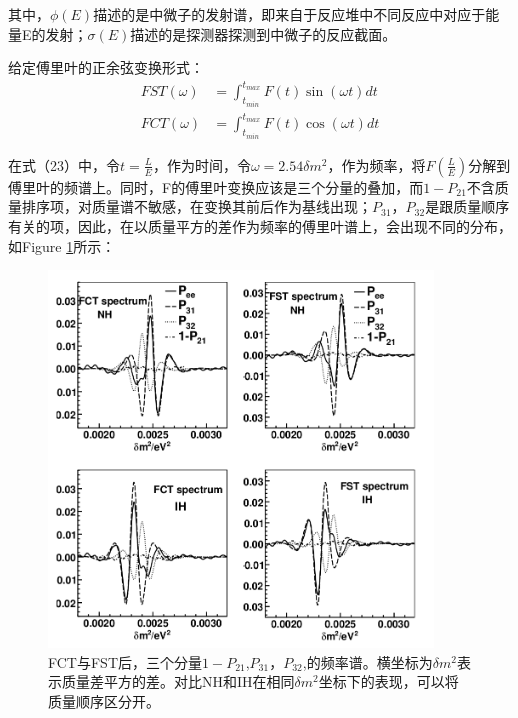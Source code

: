 \documentclass[10pt,a4paper]{article}
\begin{document}
其中，$\phi(E)$描述的是中微子的发射谱，即来自于反应堆中不同反应中对应于能量E的发射；$\sigma(E)$描述的是探测器探测到中微子的反应截面。

给定傅里叶的正余弦变换形式\cite{Zhan:2009rs}\cite{Zhan:2008id}：
\begin{equation}
\label{con:eq27}
\begin{split}
FST(\omega)&=\int_{t_{min}}^{t_{max}}F(t)\sin(\omega t)dt\\
FCT(\omega)&=\int_{t_{min}}^{t_{max}}F(t)\cos(\omega t)dt
\end{split}
\end{equation}


在式（23）中，令$t=\frac{L}{E}$，作为时间，令$\omega=2.54\delta m^2$，作为频率，将$F(\frac{L}{E})$分解到傅里叶的频谱上。同时，F的傅里叶变换应该是三个分量的叠加，而$1-P_{21}$不含质量排序项，对质量谱不敏感，在变换其前后作为基线出现；$P_{31}$，$P_{32}$是跟质量顺序有关的项，因此，在以质量平方的差作为频率的傅里叶谱上，会出现不同的分布，如Figure \ref{fig:1}所示\cite{Zhan:2008id}：
\begin{figure}[H]
 \centering
 \includegraphics[height=10cm]{images/diff-P31-P32.png}
 \caption{FCT与FST后，三个分量$1-P_{21}$,$P_{31}$，$P_{32}$,的频率谱。横坐标为$\delta m^2$表示质量差平方的差。对比NH和IH在相同$\delta m^2$坐标下的表现，可以将质量顺序区分开。}
 \label{fig:1}
\end{figure}
\end{document}
